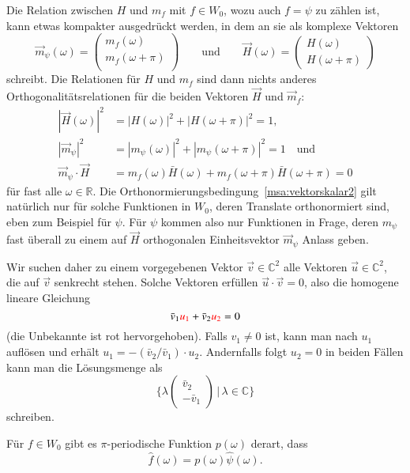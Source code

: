 Die Relation zwischen $H$ und $m_f$ mit $f\in W_0$, wozu auch $f=\psi$
zu zählen ist, kann etwas kompakter ausgedrückt werden, in dem an sie
als komplexe Vektoren
\[
\vec{m}_{\psi}(\omega)
=
\begin{pmatrix}
m_{f}(\omega)\\
m_{f}(\omega+\pi)\\
\end{pmatrix}
\qquad\text{und}\qquad
\vec{H}(\omega)
=
\begin{pmatrix}
H(\omega)\\
H(\omega + \pi)
\end{pmatrix}
\]
schreibt.
Die Relationen für $H$ und $m_f$ sind dann nichts anderes 
Orthogonalitätsrelationen für die beiden Vektoren $\vec{H}$ und
$\vec{m}_f$:
\begin{align}
|\vec{H}(\omega)|^2
&=
|H(\omega)|^2 + |H(\omega+\pi)|^2 = 1,
\label{msa:vektorskalar1}
\\
|\vec{m}_{\psi}|^2
&=
|m_{\psi}(\omega)|^2 + |m_{\psi}(\omega+\pi)|^2 = 1\quad\text{und}
\label{msa:vektorskalar2}
\\
\vec{m}_{\psi}\cdot\vec{H}
&=
m_{f}(\omega)\bar{H}(\omega)
+
m_{f}(\omega+\pi)\bar{H}(\omega+\pi)
=
0
\label{msa:vektorskalar3}
\end{align}
für fast alle $\omega\in\mathbb R$.
Die Orthonormierungsbedingung~\eqref{msa:vektorskalar2} gilt natürlich
nur für solche Funktionen in $W_0$, deren Translate orthonormiert sind,
eben zum Beispiel für $\psi$.
Für $\psi$ kommen also nur Funktionen in Frage, deren $m_{\psi}$ 
fast überall zu einem auf $\vec{H}$ orthogonalen Einheitsvektor
$\vec{m}_\psi$ Anlass geben.

Wir suchen daher zu einem vorgegebenen Vektor $\vec{v}\in\mathbb C^2$
alle Vektoren $\vec{u}\in\mathbb C^2$, die auf $\vec{v}$ senkrecht stehen.
Solche Vektoren erfüllen $\vec{u}\cdot\vec{v}=0$, also die homogene
lineare Gleichung
\[
\bar{v}_1 {\color{red}u_1} + \bar{v}_2 {\color{red} u_2} =0 
\]
(die Unbekannte ist {\color{red}rot} hervorgehoben).
Falls $v_1\ne 0$ ist, kann man nach $u_1$ auflösen und erhält
$u_1= -(\bar{v}_2/\bar{v}_1)\cdot u_2$.
Andernfalls folgt $u_2=0$ in beiden Fällen kann man die Lösungsmenge
als
\[
\biggl\{
\lambda
\begin{pmatrix}\bar{v}_2\\-\bar{v}_1\end{pmatrix}
\,\bigg|
\,\lambda\in\mathbb C
\biggr\}
\]
schreiben.

\begin{lemma}
\label{lemma:msa:pperiodisch}
Für $f\in W_0$ gibt es $\pi$-periodische Funktion $p(\omega)$ derart,
dass 
\begin{equation*}
\hat{f}(\omega)
=
p(\omega) \hat{\psi}(\omega).
\end{equation*}
\end{lemma}

